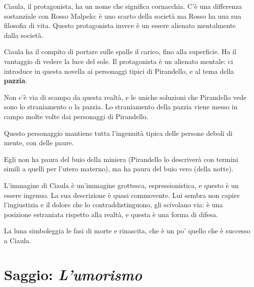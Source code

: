 Ciaula, il protagonista, ha un nome che significa cornacchia. C'è una differenza sostanziale con Rosso Malpelo: è uno scarto della società ma Rosso ha una sua filosofia di vita. Questo protagonista invece è un essere alienato mentalmente dalla società.

Ciaula ha il compito di portare sulle spalle il carico, fino alla superficie. Ha il vantaggio di vedere la luce del sole.
Il protagonista è un alienato mentale: ci introduce in questa novella ai personaggi tipici di Pirandello, e al tema della \textbf{pazzia}.

Non c'è via di scampo da questa realtà, e le uniche soluzioni che Pirandello vede sono lo straniamento o la pazzia. Lo straniamento della pazzia viene messo in campo molte volte dai personaggi di Pirandello.

Questo personaggio mantiene tutta l'ingenuità tipica delle persone deboli di mente, con delle paure.

Egli non ha paura del buio della miniera (Pirandello lo descriverà con termini simili a quelli per l'utero materno), ma ha paura del buio vero (della notte).

L'immagine di Ciaula è un'immagine grottesca, espressionistica, e questo è un essere ingenuo.
La sua descrizione è quasi commovente. Lui sembra non capire l'ingiustizia e il dolore che lo contraddistinguono, gli scivolano via: è una posizione estraniata rispetto alla realtà, e questa è una forma di difesa.


La luna simboleggia le fasi di morte e rinascita, che è un po' quello che è successo a Ciaula.

\chapter{Saggio: \textit{L'umorismo}}

